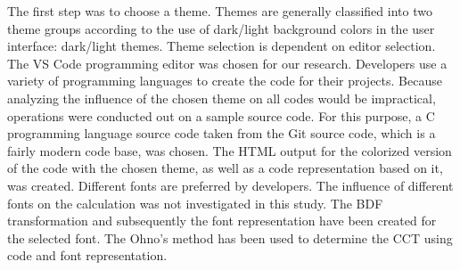 \documentclass{article}
\begin{document}
\begin{comment}
In this study, the CCT was utilized to calculate the quantity of blue light contained in popular color themes chosen by developers. It was observed that the average CCT values of both the dark and light versions of the examined themes were above the D65 threshold and contained intense blue light. Theme developers should consider the risks that blue light poses to human eye health while creating their themes.

The amount of blue light in the color theme was determined using the workflow shown in Figure
\ref{fig:general-flowchart}. Primarily, the themes to be used in the study were selected.
\end{comment}

The first step was to choose a theme. Themes are generally classified into two theme groups according to the use of dark/light background colors in the user interface: dark/light themes.  Theme selection is dependent on editor selection. The VS Code programming editor was chosen for our research. Developers use a variety of programming languages to create the code for their projects. Because analyzing the influence of the chosen theme on all codes would be impractical, operations were conducted out on a sample source code. For this purpose, a C programming language source code taken from the Git source code, which is a fairly modern code base, was chosen. The HTML output for the colorized version of the code with the chosen theme, as well as a code representation based on it, was created. Different fonts are preferred by developers. The influence of different fonts on the calculation was not investigated in this study. The BDF transformation and subsequently the font representation have been created for the selected font. The Ohno's method has been used to determine the CCT using code and font representation.

\begin{comment}
The flow of transactions taking place in the analysis is presented below, each of which is detailed in the relevant sections. As can be seen in this flowchart, all the coloring themes chosen for a single source code and font sample (bk. \ref{sec:material-methods.inputs})  are kept constant as analysis input is handled separately.
\end{comment}
\end{document}
